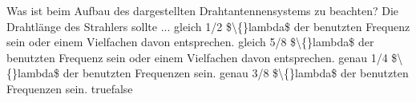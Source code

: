     {Was ist beim Aufbau des dargestellten Drahtantennensystems zu beachten? Die Drahtlänge des Strahlers sollte ...}
    {gleich 1/2 \$\textbackslash\{\}lambda\$ der benutzten Frequenz sein oder einem Vielfachen davon entsprechen.}
    {gleich 5/8 \$\textbackslash\{\}lambda\$ der benutzten Frequenz sein oder einem Vielfachen davon entsprechen.}
    {genau 1/4 \$\textbackslash\{\}lambda\$ der benutzten Frequenzen sein.}
    {genau 3/8 \$\textbackslash\{\}lambda\$ der benutzten Frequenzen sein.}
    {true}{false}